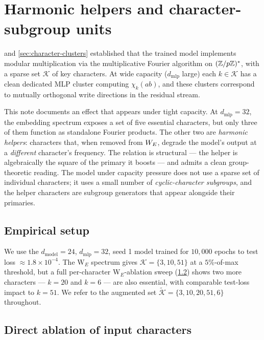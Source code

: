 \section{Harmonic helpers and character-subgroup units}
\label{sec:harmonic-helpers}

 and \cref{sec:character-clusters} established that the
trained model implements modular multiplication via the multiplicative
Fourier algorithm on $(\mathbb{Z}/p\mathbb{Z})^*$, with a sparse set $\mathcal{K}$ of key
characters. At wide capacity ($d_{\text{mlp}}$ large) each $k \in \mathcal{K}$
has a clean dedicated MLP cluster computing $\chi_k(ab)$, and these clusters
correspond to mutually orthogonal write directions in the residual stream.

This note documents an effect that appears under tight capacity. At
$d_{\text{mlp}} = 32$, the embedding spectrum exposes a set of five
essential characters, but only three of them function as standalone Fourier
products. The other two are \emph{harmonic helpers}: characters that, when
removed from $W_E$, degrade the model's output at a \emph{different}
character's frequency.  The relation is structural --- the helper is
algebraically the square of the primary it boosts --- and admits a clean
group-theoretic reading.  The model under capacity pressure does not use a
sparse set of individual characters; it uses a small number of
\emph{cyclic-character subgroups}, and the helper characters are subgroup
generators that appear alongside their primaries.

\subsection{Empirical setup}
\label{subsec:harmonic-setup}

We use the $d_{\text{model}} = 24$, $d_{\text{mlp}} = 32$, seed 1 model
trained for $10{,}000$ epochs to test loss $\approx 1.8 \times 10^{-4}$.
The W$_E$ spectrum gives $\mathcal{K} = \{3, 10, 51\}$ at a $5\%$-of-max
threshold, but a full per-character W$_E$-ablation sweep
(\cref{subsec:harmonic-ablation}) shows two more characters --- $k = 20$
and $k = 6$ --- are also essential, with comparable test-loss impact to
$k = 51$. We refer to the augmented set
$\widetilde{\mathcal{K}} = \{3, 10, 20, 51, 6\}$ throughout.

\subsection{Direct ablation of input characters}
\label{subsec:harmonic-ablation}

